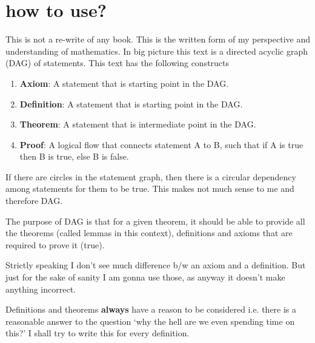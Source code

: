 \documentclass[./main.tex]{subfiles}
\begin{document}
\chapter{how to use?}
This is not a re-write of any book.
This is the written form of my perspective and understanding of mathematics.
In big picture this text is a directed acyclic graph (DAG) of statements.
This text has the following constructs
\begin{enumerate}
  \item \textbf{Axiom}: A statement that is starting point in the DAG.
  \item \textbf{Definition}: A statement that is starting point in the DAG.
  \item \textbf{Theorem}: A statement that is intermediate point in the DAG.
  \item \textbf{Proof}: A logical flow that connects statement A to B, such that if A is true then B is true, else B is false.
\end{enumerate}

If there are circles in the statement graph, then there is a circular dependency among statements for them to be true. This makes not much sense to me and therefore DAG.

The purpose of DAG is that for a given theorem, it should be able to provide all the theorems (called lemmas in this context), definitions and axioms that are required to prove it (true).

Strictly speaking I don't see much difference b/w an axiom and a definition.
But just for the sake of sanity I am gonna use those, as anyway it doesn't make anything incorrect.

Definitions and theorems \textbf{always} have a reason to be considered i.e. there is a reasonable answer to the question `why the hell are we even spending time on this?' I shall try to write this for every definition.
\end{document}
